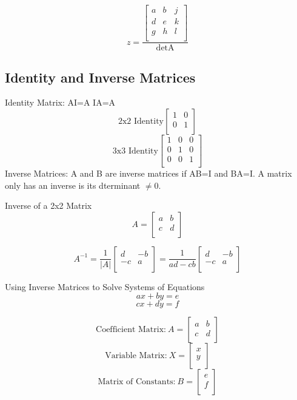 \documentclass[12pt]{article}
\numberwithin{equation}{subsection}
\begin{document}
\begin{flushleft}
\begin{equation}
z=\frac{\begin{bmatrix}
a & b & j \\
d & e & k \\
g & h & l \\
\end{bmatrix}}{\textrm{detA}}
\end{equation}  

\subsection{Identity and Inverse Matrices}

Identity Matrix: AI=A IA=A
$$\textrm{2x2 Identity} \begin{bmatrix}
1 & 0 \\
0 & 1 \\
\end{bmatrix}$$
$$\textrm{3x3 Identity} \begin{bmatrix}
1 & 0 & 0 \\
0 & 1 & 0 \\
0 & 0 & 1 \\
\end{bmatrix}$$
Inverse Matrices: A and B are inverse matrices if AB=I and BA=I. A matrix only has an inverse is its dterminant $\neq 0$.
\newpage

Inverse of a 2x2 Matrix
$$A=\begin{bmatrix}
a & b \\
c & d \\
\end{bmatrix}$$

\begin{equation}
A^{-1}=\frac{1}{\vert A \vert }\begin{bmatrix}
d & -b \\
-c & a \\
\end{bmatrix}
=
\frac{1}{ad-cb }\begin{bmatrix}
d & -b \\
-c & a \\
\end{bmatrix}
\end{equation}

Using Inverse Matrices to Solve Systems of Equations
$$ax+by=e$$
$$cx+dy=f$$

$$\textrm{Coefficient Matrix:} \ A= 
\begin{bmatrix}
a & b \\
c & d \\
\end{bmatrix}$$
$$\textrm{Variable Matrix:} \ X=\begin{bmatrix}
x\\
y\\
\end{bmatrix}$$
$$\textrm{Matrix of Constants:} \ B=\begin{bmatrix}
e\\
f\\
\end{bmatrix}$$


\end{flushleft}
\end{document}
